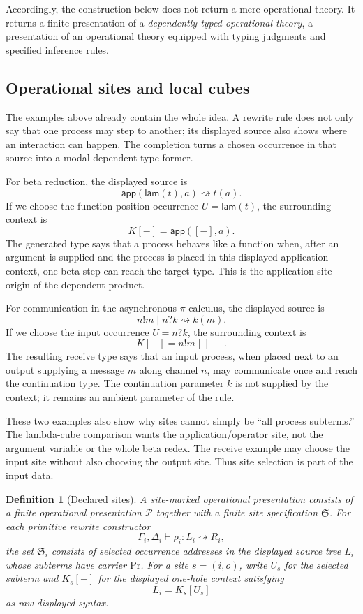 \documentclass[11pt]{article}
\newcommand{\Proc}{\mathrm{Pr}}
\newcommand{\rw}{\rightsquigarrow}
\newcommand{\app}{\mathsf{app}}
\newcommand{\lam}{\mathsf{lam}}
\newtheorem{definition}{Definition}[section]
\begin{document}
Accordingly, the construction below does not return a mere operational theory. It returns a finite presentation of a \emph{dependently-typed operational theory}, a presentation of an operational theory equipped with typing judgments and specified inference rules.

\subsection{Operational sites and local cubes}
\label{sec:construction}

The examples above already contain the whole idea.  A rewrite rule does not only
say that one process may step to another; its displayed source also shows where
an interaction can happen.  The completion turns a chosen occurrence in that
source into a modal dependent type former.

For beta reduction, the displayed source is
\[
  \app(\lam(t),a)\rw t(a).
\]
If we choose the function-position occurrence \(U=\lam(t)\), the surrounding
context is
\[
  K[-]=\app([-],a).
\]
The generated type says that a process behaves like a function when, after an
argument is supplied and the process is placed in this displayed application
context, one beta step can reach the target type.  This is the application-site
origin of the dependent product.

For communication in the asynchronous \(\pi\)-calculus, the displayed source is
\[
  n!m\mid n?k \rw k(m).
\]
If we choose the input occurrence \(U=n?k\), the surrounding context is
\[
  K[-]=n!m\mid[-].
\]
The resulting receive type says that an input process, when placed next to an
output supplying a message \(m\) along channel \(n\), may communicate once and
reach the continuation type.  The continuation parameter \(k\) is not supplied
by the context; it remains an ambient parameter of the rule.

These two examples also show why sites cannot simply be ``all process
subterms.''  The lambda-cube comparison wants the application/operator site, not
the argument variable or the whole beta redex.  The receive example may choose
the input site without also choosing the output site.  Thus site selection is
part of the input data.

\begin{definition}[Declared sites]
A site-marked operational presentation consists of a finite operational
presentation \(\mathcal P\) together with a finite site specification
\(\mathfrak S\).  For each primitive rewrite constructor
\[
  \Gamma_i,\Delta_i\vdash \rho_i:L_i\rw R_i,
\]
the set \(\mathfrak S_i\) consists of selected occurrence addresses in the
\emph{displayed} source tree \(L_i\) whose subterms have carrier \(\Proc\).
For a site \(s=(i,o)\), write \(U_s\) for the selected subterm and
\(K_s[-]\) for the displayed one-hole context satisfying
\[
  L_i=K_s[U_s]
\]
as raw displayed syntax.
\end{definition}
\end{document}
